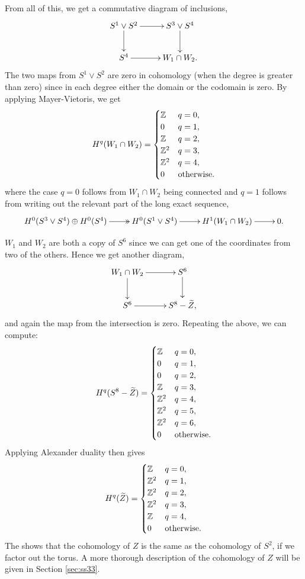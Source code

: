 \begin{example}
  From all of this, we get a commutative diagram of inclusions,
  \[ \xymatrix{
    S^1\vee S^2 \ar[r]\ar[d] & S^3\vee S^4 \ar[d] \\
    S^4 \ar[r] & W_1\cap W_2.
  } \]
  The two maps from $S^1\vee S^2$ are zero in cohomology (when the
  degree is greater than zero) since in each
  degree either the domain or the codomain is zero. By applying
  Mayer-Vietoris, we get
  \[ H^q(W_1\cap W_2) =
  \begin{cases}
    \mathbb{Z} & q=0, \\
    0 & q = 1, \\
    \mathbb{Z} & q = 2, \\
    \mathbb{Z}^2 & q = 3, \\
    \mathbb{Z}^2 & q =4, \\
    0 & \text{otherwise}.
  \end{cases} \]
  where the case $q=0$ follows from $W_1\cap W_2$ being connected
  and $q = 1$ follows from writing out the relevant part of the
  long exact sequence,
  \[ \xymatrix{ H^0(S^3\vee S^4)\oplus H^0(S^4) \ar@{->>}[r] &
    H^0(S^1\vee S^4) \ar[r] & H^1(W_1\cap W_2) \ar[r] & 0.} \]
  
  $W_1$ and $W_2$ are both a copy of $S^6$ since we can get one of
  the coordinates from two of the others. Hence we get another diagram,
  \[ \xymatrix{
    W_1\cap W_2 \ar[r]\ar[d] & S^6 \ar[d] \\
    S^6 \ar[r] & S^8-\widetilde Z,
  } \]
  and again the map from the intersection is zero. Repeating the
  above, we can compute:
  \[ H^q(S^8-\widetilde Z) =
  \begin{cases}
    \mathbb{Z} & q = 0, \\
    0 & q = 1, \\
    0 & q = 2, \\
    \mathbb{Z} & q = 3, \\
    \mathbb{Z}^2 & q = 4, \\
    \mathbb{Z}^2 & q = 5, \\
    \mathbb{Z}^2 & q =6, \\
    0 & \text{otherwise}.
  \end{cases} \]
  Applying Alexander duality then gives
  \[ H^q(\widetilde Z) =
  \begin{cases}
    \mathbb{Z} & q = 0, \\
    \mathbb{Z}^2 & q = 1, \\
    \mathbb{Z}^2 & q = 2, \\
    \mathbb{Z}^2 & q = 3, \\
    \mathbb{Z} & q = 4, \\
    0 & \text{otherwise}.
  \end{cases} \]
  The shows that the cohomology of $Z$ is the same as the
  cohomology of $S^2$, if we factor out the torus. A more
  thorough description of the cohomology of $Z$ will be given in
  Section \ref{sec:ss33}.


\end{example}
